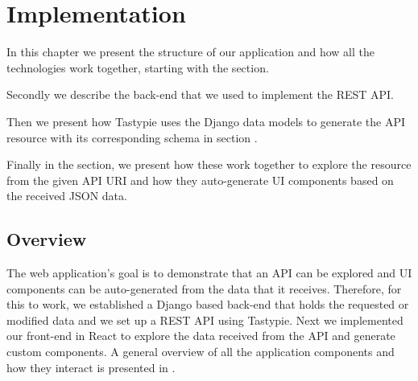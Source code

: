 \chapter{Implementation}
\label{chapter:implementation}

In this chapter we present the structure of our application and how all the technologies work together, starting with the  section.

Secondly we describe the back-end  that we used to implement the REST API.

Then we present how Tastypie uses the Django data models to generate the API resource with its corresponding schema in section .

Finally in the  section, we present how these work together to explore the resource from the given API URI and how they auto-generate UI components based on the received JSON data.

\section{Overview}
\label{sec:overview}

The web application's goal is to demonstrate that an API can be explored and UI components can be auto-generated from the data that it receives. Therefore, for this to work, we established a Django based back-end that holds the requested or modified data and we set up a REST API using Tastypie. Next we implemented our front-end in React to explore the data received from the API and generate custom components. A general overview of all the application components and how they interact is presented in . %


